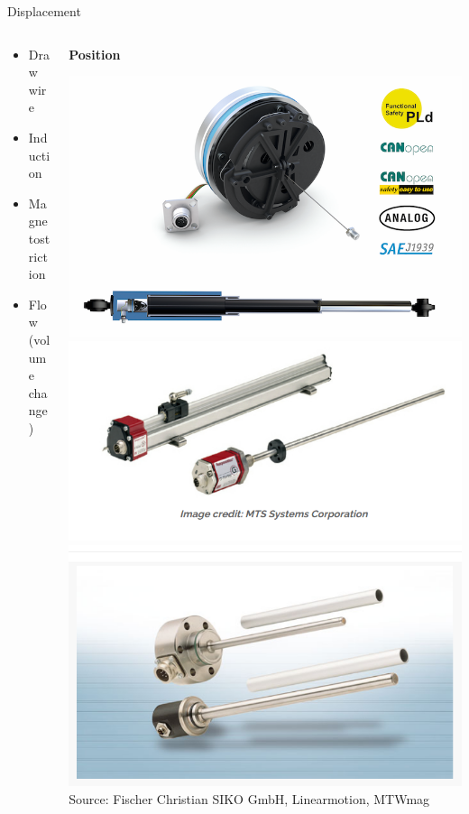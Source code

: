 \documentclass[presentation,aspectratio=169]{beamer}
\begin{document}
\begin{frame}[label={sec:orga6a633b}]{Displacement}
\begin{columns}
\begin{column}{0.3\columnwidth}
\begin{itemize}
\item Draw wire
\item Induction
\item Magnetostriction
\item Flow (volume change)
\end{itemize}
\end{column}

\begin{column}{0.7\columnwidth}
\textbf{Position}
\pause
\begin{center}
\includegraphics[width=0.5\linewidth]{../../figures/PosSensor.png}\\
\includegraphics[width=0.45\linewidth]{../../figures/magnetostriction.png}
\includegraphics[width=0.45\linewidth]{../../figures/inductive.png}\\
{\tiny Source:  Fischer Christian SIKO GmbH, Linearmotion, MTWmag}
\end{center}
\end{column}
\end{columns}
\end{frame}
\end{document}
